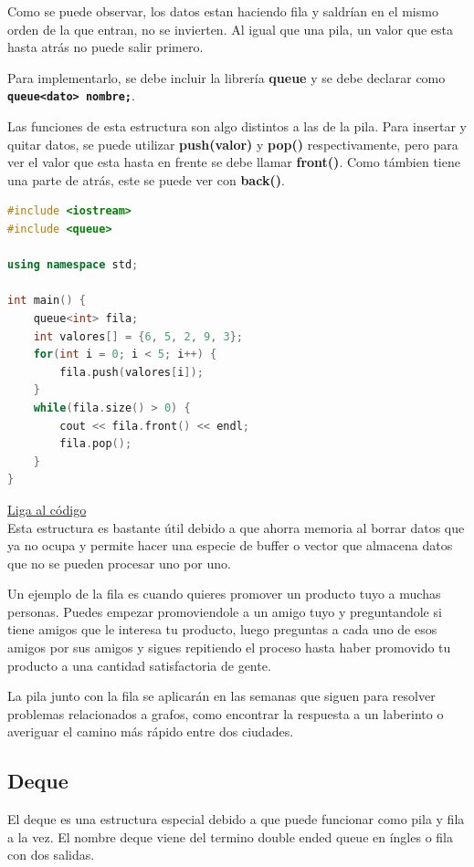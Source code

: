 \documentclass{article}
\begin{document}
Como se puede observar, los datos estan haciendo fila y saldrían en el mismo orden de la que entran, no se invierten. Al igual que una pila, un valor que esta hasta atrás no puede salir primero.

Para implementarlo, se debe incluir la librería \textbf{queue} y se debe declarar como \textbf{\lstinline{queue<dato> nombre;}}.

Las funciones de esta estructura son algo distintos a las de la pila. Para insertar y quitar datos, se puede utilizar \textbf{push(valor)} y \textbf{pop()} respectivamente, pero para ver el valor que esta hasta en frente se debe llamar \textbf{front()}. Como támbien tiene una parte de atrás, este se puede ver con \textbf{back()}.

\begin{lstlisting}[language=C++, caption=Filas]
#include <iostream>
#include <queue>

using namespace std;

int main() {
    queue<int> fila;
    int valores[] = {6, 5, 2, 9, 3};
    for(int i = 0; i < 5; i++) {
        fila.push(valores[i]);
    }
    while(fila.size() > 0) {
        cout << fila.front() << endl;
        fila.pop();
    }
}
\end{lstlisting}
\href{https://repl.it/@Jamesscn/Haciendo-filas}{Liga al código} \\

Esta estructura es bastante útil debido a que ahorra memoria al borrar datos que ya no ocupa y permite hacer una especie de buffer o vector que almacena datos que no se pueden procesar uno por uno.

Un ejemplo de la fila es cuando quieres promover un producto tuyo a muchas personas. Puedes empezar promoviendole a un amigo tuyo y preguntandole si tiene amigos que le interesa tu producto, luego preguntas a cada uno de esos amigos por sus amigos y sigues repitiendo el proceso hasta haber promovido tu producto a una cantidad satisfactoria de gente.

La pila junto con la fila se aplicarán en las semanas que siguen para resolver problemas relacionados a grafos, como encontrar la respuesta a un laberinto o averiguar el camino más rápido entre dos ciudades.

\subsection{Deque}

El deque es una estructura especial debido a que puede funcionar como pila y fila a la vez. El nombre deque viene del termino double ended queue en íngles o fila con dos salidas.
\end{document}
